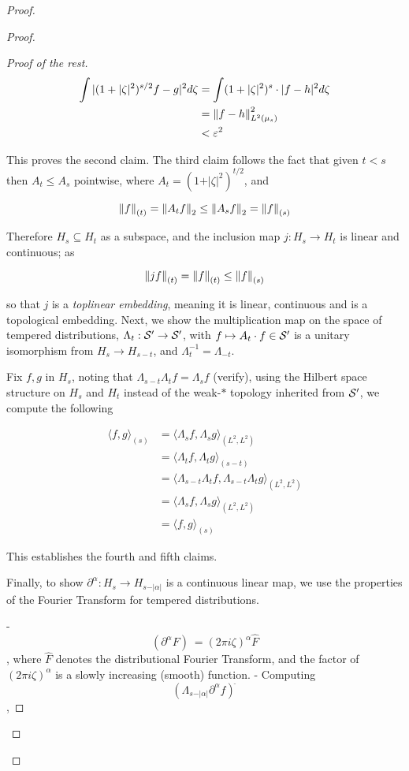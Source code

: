 \documentclass[../main-manifolds.tex]{subfiles}
\begin{document}
{{\begin{proof}
{{\begin{proof}
\begin{proof}[Proof of the rest]
$$
\begin{align}
\int \vert (1+\vert\zeta\vert^2)^{s/2}f - g\vert^2d\zeta &= \int (1+\vert\zeta\vert^2)^{s}\cdot \vert f-h\vert^2d\zeta\\
&=\norm{f-h}_{L^2(\mu_s)}^2\\
&< \varepsilon^2
\end{align}
$$

This proves the second claim. The third claim follows the fact that given $t<s$ then $A_t\leq A_s$ pointwise, where $A_t = (1+\vert\zeta\vert^2)^{t/2}$, and 

$$
\norm{f}_{(t)} = \norm{A_t f}_{2}\leq \norm{A_s f}_{2} = \norm{f}_{(s)}
$$

Therefore $H_s\subseteq H_t$ as a subspace, and the inclusion map $j: H_s\to H_t$ is linear and continuous; as

$$
\norm{jf}_{(t)}= \norm{f}_{(t)}\leq \norm{f}_{(s)}
$$

so that $j$ is a \emph{toplinear embedding}, meaning it is linear, continuous and is a topological embedding. Next, we show the multiplication map on the space of tempered distributions, $\Lambda_t: \mathcal{S}'\to \mathcal{S}'$, with $f\mapsto A_t\cdot f\in \mathcal{S}'$ is a unitary isomorphism from $H_s\to H_{s-t}$, and $\Lambda_t^{-1} = \Lambda_{-t}$.

Fix $f,g$ in $H_s$, noting that $\Lambda_{s-t}\Lambda_{t} f = \Lambda_s f$ (verify), using the Hilbert space structure on $H_s$ and $H_t$ instead of the weak-$\ast$ topology inherited from $\mathcal{S}'$, we compute the following

$$
\begin{align}
\langle f,g\rangle_{(s)}&= \langle \Lambda_s f,\Lambda_s g \rangle_{(L^2, L^2)}\\
&= \langle \Lambda_t f,\Lambda_t g \rangle_{(s-t)} \\
&= \langle\Lambda_{s-t}\Lambda_{t} f, \Lambda_{s-t}\Lambda_{t} g  \rangle_{(L^2, L^2)}\\
&= \langle \Lambda_{s}f, \Lambda_{s} g \rangle_{(L^2,L^2)}\\
&= \langle f,g\rangle_{(s)}
\end{align}
$$

This establishes the fourth and fifth claims. 

Finally, to show $\partial^\alpha: H_s\to H_{s-\vert\alpha\vert}$ is a continuous linear map, we use the properties of the Fourier Transform for tempered distributions.

- $$(\partial^\alpha F)^{\hat{\:}} = (2\pi i \zeta)^{\alpha}\hat{F}$$, where $\hat{F}$ denotes the distributional Fourier Transform, and the factor of $(2\pi  i \zeta)^{\alpha}$ is a slowly increasing (smooth) function.
- Computing $$(\Lambda_{s-\vert\alpha\vert}\partial^\alpha f)^{\hat{\:}}$$,


\end{proof}
\end{proof}}}
\end{proof}}}
\end{document}
